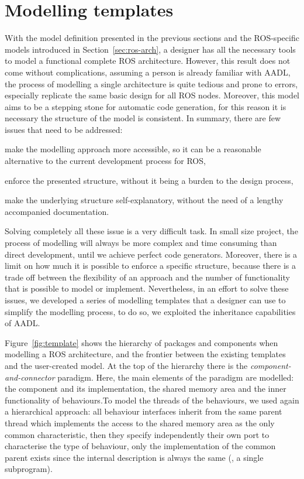 \section{Modelling templates}
\label{sec:template}
With the model definition presented in the previous sections and the ROS-specific models introduced in Section~\ref{sec:ros-arch}, a designer has all the necessary tools to model a functional complete ROS architecture. However, this result does not come without complications, assuming a person is already familiar with AADL, the process of modelling a single architecture is quite tedious and prone to errors, especially replicate the same basic design for all ROS nodes. Moreover, this model aims to be a stepping stone for automatic code generation, for this reason it is necessary the structure of the model is consistent. In summary, there are few issues that need to be addressed:
\begin{enumerate*}[label={\alph*)}]
\item make the modelling approach more accessible, so it can be a reasonable alternative to the current development process for ROS,
\item enforce the presented structure, without it being a burden to the design process,
\item make the underlying structure self-explanatory, without the need of a lengthy accompanied documentation.
\end{enumerate*}

Solving completely all these issue is a very difficult task. In small size project, the process of modelling will always be more complex and time consuming than direct development, until we achieve perfect code generators.  Moreover, there is a limit on how much it is possible to enforce a specific structure, because there is a trade off between the flexibility of an approach and the number of functionality that is possible to model or implement. Nevertheless, in an effort to solve these issues, we developed a series of modelling templates that a designer can use to simplify the modelling process, to do so, we exploited the inheritance capabilities of AADL.

Figure~\ref{fig:template} shows the hierarchy of packages and components when modelling a ROS architecture, and the frontier between the existing templates and the user-created model. At the top of the hierarchy there is the \textit{component-and-connector} paradigm. Here, the main elements of the paradigm are modelled: the component and its implementation, the shared memory area and the inner functionality of behaviours.To model the threads of the behaviours, we used again a hierarchical approach: all behaviour interfaces inherit from the same parent thread which implements the access to the shared memory area as the only common characteristic, then they specify independently their own port to characterise the type of behaviour, only the implementation of the common parent exists since the internal description is always the same (\ie, a single subprogram).

